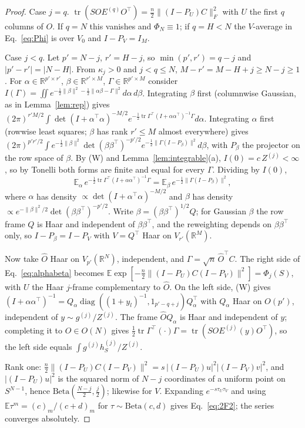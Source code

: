 \documentclass[11pt]{article}
\newcommand{\tr}{\operatorname{tr}}
\newcommand{\R}{\mathbb{R}}
\newcommand{\E}{\mathbb{E}}
\newcommand{\diag}{\operatorname{diag}}
\theoremstyle{remark}
\begin{document}
\begin{proof}
Case $j=q$.
$\tr(SOE^{(q)}O^\top)=\tfrac n2\lVert(I-P_U)C\rVert_F^2$ with $U$ the first $q$ columns of $O$.
If $q=N$ this vanishes and $\Phi_N\equiv1$; if $q=H<N$ the $V$-average in Eq.~\eqref{eq:Phi} is over $V_0$ and $I-P_V=I_M$.

Case $j<q$.
Let $p'=N-j$, $r'=H-j$, so $\min(p',r')=q-j$ and $\lvert p'-r'\rvert=\lvert N-H\rvert$.
From $\kappa_j>0$ and $j<q\le N$, $M-r'=M-H+j\ge N-j\ge1$.
For $\alpha\in\R^{p'\times r'}$, $\beta\in\R^{r'\times M}$, $\Gamma\in\R^{p'\times M}$ consider $I(\Gamma)=\iint e^{-\frac12\lVert\beta\rVert^2-\frac12\lVert\alpha\beta-\Gamma\rVert^2}d\alpha\,d\beta$.
Integrating $\beta$ first (columnwise Gaussian, as in Lemma~\ref{lem:rep}) gives
$(2\pi)^{r'M/2}\int\det(I+\alpha^\top\alpha)^{-M/2}e^{-\frac12\tr\Gamma^\top(I+\alpha\alpha^\top)^{-1}\Gamma}d\alpha$.
Integrating $\alpha$ first (rowwise least squares; $\beta$ has rank $r'\le M$ almost everywhere) gives
$(2\pi)^{p'r'/2}\int e^{-\frac12\lVert\beta\rVert^2}\det(\beta\beta^\top)^{-p'/2}e^{-\frac12\lVert\Gamma(I-P_\beta)\rVert^2}d\beta$, with $P_\beta$ the projector on the row space of $\beta$.
By (W) and Lemma~\ref{lem:integrable}(a), $I(0)=c\,Z^{(j)}<\infty$, so by Tonelli both forms are finite and equal for every $\Gamma$.
Dividing by $I(0)$,
\begin{equation}
  \E_\alpha\,e^{-\frac12\tr\Gamma^\top(I+\alpha\alpha^\top)^{-1}\Gamma}=\E_\beta\,e^{-\frac12\lVert\Gamma(I-P_\beta)\rVert^2},
  \label{eq:alphabeta}
\end{equation}
where $\alpha$ has density $\propto\det(I+\alpha^\top\alpha)^{-M/2}$ and $\beta$ has density $\propto e^{-\lVert\beta\rVert^2/2}\det(\beta\beta^\top)^{-p'/2}$.
Write $\beta=(\beta\beta^\top)^{1/2}Q$; for Gaussian $\beta$ the row frame $Q$ is Haar and independent of $\beta\beta^\top$, and the reweighting depends on $\beta\beta^\top$ only, so $I-P_\beta=I-P_V$ with $V=Q^\top$ Haar on $V_{r'}(\R^M)$.

Now take $\hat O$ Haar on $V_{p'}(\R^N)$, independent, and $\Gamma=\sqrt n\,\hat O^\top C$.
The right side of Eq.~\eqref{eq:alphabeta} becomes $\E\exp[-\tfrac n2\lVert(I-P_U)C(I-P_V)\rVert^2]=\Phi_j(S)$, with $U$ the Haar $j$-frame complementary to $\hat O$.
On the left side, (W) gives $(I+\alpha\alpha^\top)^{-1}=Q_\alpha\diag((1+y_l)^{-1},1_{p'-q+j})Q_\alpha^\top$ with $Q_\alpha$ Haar on $O(p')$, independent of $y\sim g^{(j)}/Z^{(j)}$.
The frame $\hat OQ_\alpha$ is Haar and independent of $y$; completing it to $O\in O(N)$ gives $\tfrac12\tr\Gamma^\top(\cdot)\Gamma=\tr(SOE^{(j)}(y)O^\top)$, so the left side equals $\int g^{(j)}h^{(j)}_S/Z^{(j)}$.

Rank one: $\tfrac n2\lVert(I-P_U)C(I-P_V)\rVert^2=s\,\lvert(I-P_U)u\rvert^2\lvert(I-P_V)v\rvert^2$, and $\lvert(I-P_U)u\rvert^2$ is the squared norm of $N-j$ coordinates of a uniform point on $S^{N-1}$, hence $\mathrm{Beta}(\tfrac{N-j}2,\tfrac j2)$; likewise for $V$.
Expanding $e^{-s\tau_U\tau_V}$ and using $\E\tau^m=(c)_m/(c+d)_m$ for $\tau\sim\mathrm{Beta}(c,d)$ gives Eq.~\eqref{eq:2F2}; the series converges absolutely.
\end{proof}
\end{document}
